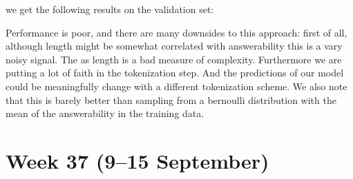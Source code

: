 \documentclass[11pt]{article}
\begin{document}
\begin{enumerate}
    we get the following results on the validation set:

    \begin{table}[ht]
        \centering
        \caption{Performance metrics of the rule-based classifier on the validation set}
        \label{tab:classifier_performance}
    \end{table}

    Performance is poor, and there are many downsides to this approach: 
    first of all, although length might be somewhat correlated with answerability this is a vary noisy signal. 
    The as length is a bad measure of complexity.
    Furthermore we are putting a lot of faith in the tokenization step. And the predictions of our model could be meaningfully change with a different tokenization scheme.
    We also note that this is barely better than sampling from a bernoulli distribution with the mean of the answerability in the training data.

\end{enumerate}

\section{Week 37 (9--15 September)}
\end{document}

